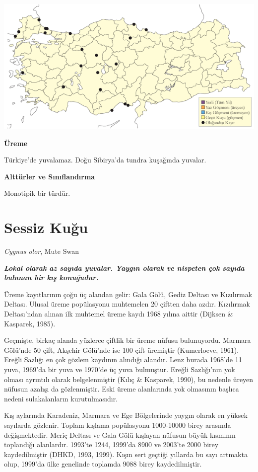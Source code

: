 \documentclass[
  a4paper,
  DIV=11,
  numbers=noendperiod]{scrreprt}
\begin{document}
\includegraphics{images/harita_Page_007.png}

\textbf{Üreme}

Türkiye'de yuvalamaz. Doğu Sibirya'da tundra kuşağında yuvalar.

\textbf{Alttürler ve Sınıflandırma}

Monotipik bir türdür.

\section{Sessiz Kuğu}\label{sessiz-kuux11fu}

\emph{Cygnus olor}, Mute Swan

\textbf{\emph{Lokal olarak az sayıda yuvalar. Yaygın olarak ve nispeten
çok sayıda bulunan bir kış konuğudur.}}

Üreme kayıtlarının çoğu üç alandan gelir: Gala Gölü, Gediz Deltası ve
Kızılırmak Deltası. Ulusal üreme popülasyonu muhtemelen 20 çiftten daha
azdır. Kızılırmak Deltası'ndan alınan ilk muhtemel üreme kaydı 1968
yılına aittir (Dijksen \& Kasparek, 1985).

Geçmişte, birkaç alanda yüzlerce çiftlik bir üreme nüfusu bulunuyordu.
Marmara Gölü'nde 50 çift, Akşehir Gölü'nde ise 100 çift üremiştir
(Kumerloeve, 1961). Ereğli Sazlığı en çok gözlem kaydının alındığı
alandır. Lenz burada 1968'de 11 yuva, 1969'da bir yuva ve 1970'de üç
yuva bulmuştur. Ereğli Sazlığı'nın yok olması ayrıntılı olarak
belgelenmiştir (Kılıç \& Kasparek, 1990), bu nedenle üreyen nüfusun
azalışı da gözlenmiştir. Eski üreme alanlarında yok olmasının başlıca
nedeni sulakalanların kurutulmasıdır.

Kış aylarında Karadeniz, Marmara ve Ege Bölgelerinde yaygın olarak en
yüksek sayılarda gözlenir. Toplam kışlama popülasyonu 1000-10000 birey
arasında değişmektedir. Meriç Deltası ve Gala Gölü kışlayan nüfusun
büyük kısmının toplandığı alanlardır. 1993'te 1244, 1999'da 8900 ve
2003'te 2000 birey kaydedilmiştir (DHKD, 1993, 1999). Kışın sert geçtiği
yıllarda bu sayı artmakta olup, 1999'da ülke genelinde toplamda 9088
birey kaydedilmiştir.
\end{document}
